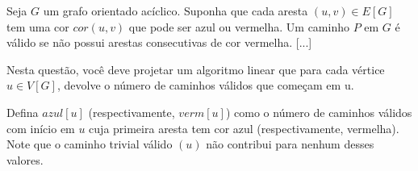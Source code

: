 Seja $G$ um grafo orientado acíclico. Suponha que cada aresta $(u, v) \in E[G]$ tem uma cor $cor(u, v)$ que pode ser azul ou vermelha. Um caminho $P$ em $G$ é válido se não possui arestas consecutivas de cor vermelha. [...]

Nesta questão, você deve projetar um algoritmo linear que para cada vértice $u \in V[G]$, devolve o número de caminhos válidos que começam em u.

\begin{definition*}
    Defina $azul[u]$ (respectivamente, $verm[u]$) como o número de caminhos válidos com início em $u$ cuja primeira aresta tem cor azul (respectivamente, vermelha). Note que o caminho trivial válido $(u)$ não contribui para nenhum desses valores.
\end{definition*}

\itemdsep
